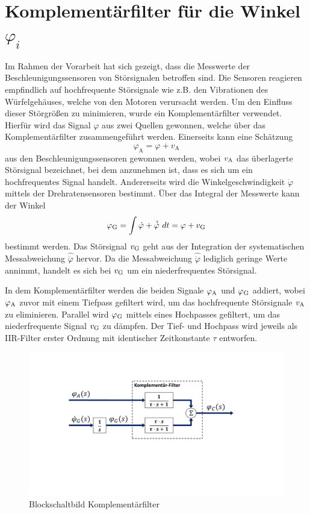 \section{Komplementärfilter für die Winkel $\varphi_i$}
Im Rahmen der Vorarbeit hat sich gezeigt, dass die Messwerte der Beschleunigungssensoren von Störsignalen betroffen sind. Die Sensoren reagieren empfindlich auf hochfrequente Störsignale wie z.B. den Vibrationen des Würfelgehäuses, welche von den Motoren verursacht werden. Um den Einfluss dieser Störgrößen zu minimieren, wurde ein Komplementärfilter verwendet. Hierfür wird das Signal $\varphi$ aus zwei Quellen gewonnen, welche über das Komplementärfilter zusammengeführt werden. Einerseits kann eine Schätzung
\begin{equation}
\varphi_{\text{A}} = \varphi + v_{\text{A}}
\end{equation}
aus den Beschleunigungssensoren gewonnen werden, wobei $v_{\text{A}}$ das überlagerte Störsignal bezeichnet, bei dem anzunehmen ist, dass es sich um ein hochfrequentes Signal handelt. Andererseits wird die Winkelgeschwindigkeit $\dot{\varphi}$ mittels der Drehratensensoren bestimmt. Über das Integral der Messwerte kann der Winkel
\begin{equation}
\varphi_{\text{G}} = \int \dot{\varphi} + \hat{\dot{\varphi}}\ dt = \varphi + v_{\text{G}} 
\end{equation}
bestimmt werden. Das Störsignal $v_{\text{G}}$ geht aus der Integration der systematischen Messabweichung $\hat{\dot{\varphi}}$ hervor. Da die Messabweichung $\hat{\dot{\varphi}}$ lediglich geringe Werte annimmt, handelt es sich bei $v_{\text{G}}$ um ein niederfrequentes Störsignal.

In dem Komplementärfilter werden die beiden Signale $\varphi_{\text{A}}$ und $\varphi_{\text{G}}$ addiert, wobei $\varphi_{\text{A}}$ zuvor mit einem Tiefpass gefiltert wird, um das hochfrequente Störsignale $v_{\text{A}}$ zu eliminieren. Parallel wird $\varphi_{\text{G}}$ mittels eines Hochpasses gefiltert, um das niederfrequente Signal $v_{\text{G}}$ zu dämpfen. Der Tief- und Hochpass wird jeweils als IIR-Filter erster Ordnung mit identischer Zeitkonstante $\tau$ entworfen.
\begin{figure}[h!]
\includegraphics[width=1\linewidth, trim={2cm 7.5cm 4cm 3.5cm}, clip]{img/CompFilter}
\caption{Blockschaltbild Komplementärfilter}
\label{bsb_kompfilter}
\end{figure}

